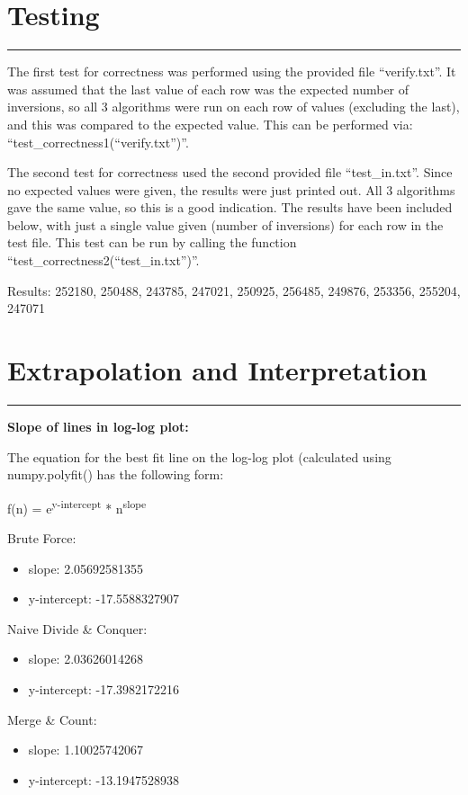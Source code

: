 \documentclass[letterpaper,10pt,titlepage,fleqn]{article}
\begin{document}
\section*{Testing}
\hrule
The first test for correctness was performed using the provided file ``verify.txt''. It was assumed that the last value of each row was the expected number of inversions, so all 3 algorithms were run on each row of values (excluding the last), and this was compared to the expected value. This can be performed via: ``test\_correctness1(``verify.txt'')''.

The second test for correctness used the second provided file ``test\_in.txt''. Since no expected values were given, the results were just printed out. All 3 algorithms gave the same value, so this is a good indication. The results have been included below, with just a single value given (number of inversions) for each row in the test file. This test can be run by calling the function ``test\_correctness2(``test\_in.txt'')''.

Results:
252180, 250488, 243785, 247021, 250925, 256485, 249876, 253356, 255204, 247071

\section*{Extrapolation and Interpretation}
\hrule

\begin{centering}
\textbf{Slope of lines in log-log plot:}
\end{centering}

The equation for the best fit line on the log-log plot (calculated using numpy.polyfit() has the following form:

f(n) = e\textsuperscript{y-intercept} * n\textsuperscript{slope}

Brute Force:
\begin{itemize}
\item slope: 2.05692581355
\item y-intercept: -17.5588327907
\end{itemize}

Naive Divide \& Conquer:
\begin{itemize}
\item slope: 2.03626014268
\item y-intercept: -17.3982172216
\end{itemize}

Merge \& Count:
\begin{itemize}
\item slope: 1.10025742067
\item y-intercept: -13.1947528938
\end{itemize}
\end{document}
